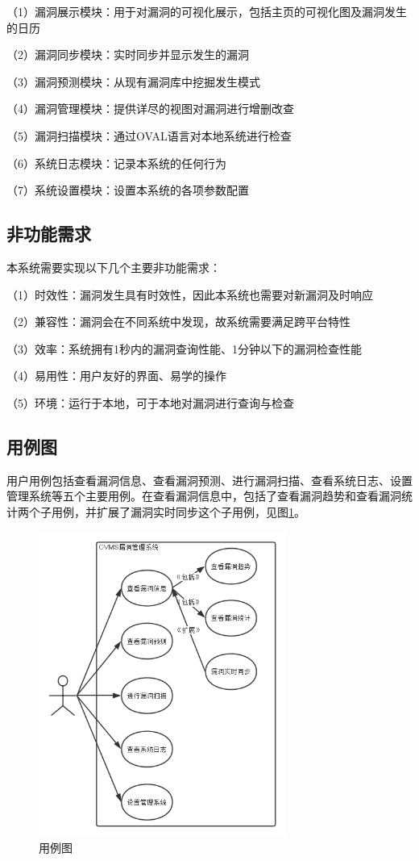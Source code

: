 \documentclass[a4paper]{ctexrep}
\begin{document}
			（1）漏洞展示模块：用于对漏洞的可视化展示，包括主页的可视化图及漏洞发生的日历

			（2）漏洞同步模块：实时同步并显示发生的漏洞

			（3）漏洞预测模块：从现有漏洞库中挖掘发生模式

			（4）漏洞管理模块：提供详尽的视图对漏洞进行增删改查

			（5）漏洞扫描模块：通过OVAL语言对本地系统进行检查

			（6）系统日志模块：记录本系统的任何行为

			（7）系统设置模块：设置本系统的各项参数配置

			\subsection{非功能需求}
			本系统需要实现以下几个主要非功能需求：

			（1）时效性：漏洞发生具有时效性，因此本系统也需要对新漏洞及时响应

			（2）兼容性：漏洞会在不同系统中发现，故系统需要满足跨平台特性

			（3）效率：系统拥有1秒内的漏洞查询性能、1分钟以下的漏洞检查性能

			（4）易用性：用户友好的界面、易学的操作

			（5）环境：运行于本地，可于本地对漏洞进行查询与检查

			\subsection{用例图}
			用户用例包括查看漏洞信息、查看漏洞预测、进行漏洞扫描、查看系统日志、设置管理系统等五个主要用例。在查看漏洞信息中，包括了查看漏洞趋势和查看漏洞统计两个子用例，并扩展了漏洞实时同步这个子用例，见图\ref{fig:1}。
				\begin{figure}[htb]
					\centering
					\includegraphics[height=10cm]{fig/1_usecase.png}
					\caption{\label{fig:1} 用例图}
				\end{figure}
\end{document}
